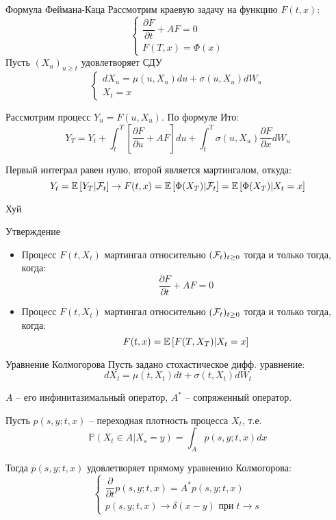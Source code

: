\documentclass{beamer}
\begin{document}
\begin{frame}{Формула Феймана-Каца}
    Рассмотрим краевую задачу на функцию $F(t, x)$:
    $$\begin{cases}
        \dfrac{\partial F}{\partial t}+AF = 0 \\
        F(T, x) = \Phi(x)
    \end{cases}
    $$
    Пусть $(X_u)_{u \geq t}$ удовлетворяет СДУ     $$
        \begin{cases}
            dX_u = \mu(u, X_u) du + \sigma(u, X_u) dW_u
            \\
            X_t = x
        \end{cases}
    $$

    Рассмотрим процесс $Y_u = F(u, X_u)$. По формуле Ито:
    $$
        Y_T = Y_t + \int_t^T \left[\dfrac{\partial F}{\partial u}+AF\right]du + \int_t^T \sigma(u, X_u) \dfrac{\partial F}{\partial x} dW_u
    $$

    Первый интеграл равен нулю, второй является мартингалом, откуда:
    $$
        Y_t = \mathbb{E} \left[ Y_T | \mathcal{F}_t\right] \to F(t, x) = \mathbb{E} \left[ \Phi(X_T) | \mathcal{F}_t\right] = \mathbb{E} \left[ \Phi(X_T) | X_t=x\right] 
    $$
\end{frame}

\begin{frame}{Хуй}
    \begin{block}{Утверждение}
    \begin{itemize}
        \item         Процесс $F(t, X_t)$ мартингал относительно $(\mathcal{F}_t)_{t\geq0}$ тогда и только тогда, когда:
        $$
            \dfrac{\partial F}{\partial t}+AF = 0
        $$
        \item         Процесс $F(t, X_t)$ мартингал относительно $(\mathcal{F}_t)_{t\geq0}$ тогда и только тогда, когда:
        $$
            F(t,x)=\mathbb{E} \left[ F(T,X_T) | X_t=x\right] 
        $$
    \end{itemize}

    \end{block}
\end{frame}

\begin{frame}{Уравнение Колмогорова}
        Пусть задано стохастическое дифф. уравнение:
    $$
        dX_t = \mu(t, X_t) dt + \sigma(t, X_t) dW_t
    $$

    $A$ -- его инфинитазимальный оператор, $A^*$ -- сопряженный оператор. 

    Пусть $p(s, y; t, x)$ -- переходная плотность процесса $X_t$, т.е.
    $$
        \mathbb{P}( X_t \in A | X_s = y) = \int_A p(s, y; t, x) dx
    $$

    Тогда $p(s, y; t, x)$ удовлетворяет прямому уравнению Колмогорова:
    $$ 
    \begin{cases}
        \dfrac{\partial }{\partial t} p(s, y; t, x) = A^* p(s, y; t, x)\\
        p(s, y; t, x) \to \delta(x-y) \text{ при} \; t\to s
    \end{cases}
        
    $$
\end{frame}
\end{document}
